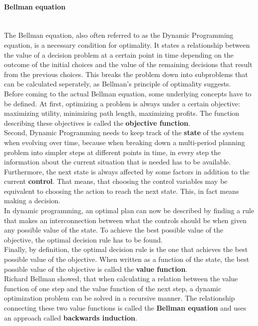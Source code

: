 \documentclass[conference]{IEEEtran}
\begin{document}
\paragraph{Bellman equation}
\quad \\
The Bellman equation, also often referred to as the Dynamic Programming equation, is a necessary condition for optimality.
It states a relationship between the value of a decision problem at a certain point in time depending on the outcome of the initial choices and the value of the remaining decisions that result from the previous choices. 
This breaks the problem down into subproblems that can be calculated seperately, as Bellman's principle of optimality suggests.\\
Before coming to the actual Bellman equation, some underlying concepts have to be defined.
At first, optimizing a problem is always under a certain objective: maximizing utility, minimizing path length, maximizing profits. The function describing these objectives is called the \textbf{objective function}.\\
Second, Dynamic Programming needs to keep track of the \textbf{state} of the system when evolving over time, because when breaking down a multi-period planning problem into simpler steps at different points in time, in every step the information about the current situation that is needed has to be available.\\
Furthermore, the next state is always affected by some factors in addition to the current \textbf{control}. That means, that choosing the control variables may be equivalent to choosing the action to reach the next state. This, in fact means making a decision.\\
In dynamic programming, an optimal plan can now be described by finding a rule that makes an interconnection between what the controls should be when given any possible value of the state. To achieve the best possible value of the objective, the optimal decision rule has to be found.\\
Finally, by definition, the optimal decision rule is the one that achieves the best possible value of the objective. When written as a function of the state, the best possible value of the objective is called the \textbf{value function}.\\
Richard Bellman showed, that when calculating a relation between the value function of one step and the value function of the next step, a dynamic optimization problem can be solved in a recursive manner. The relationship connecting these two value functions is called the \textbf{Bellman equation} and uses an approach called \textbf{backwards induction}.\\
\end{document}
